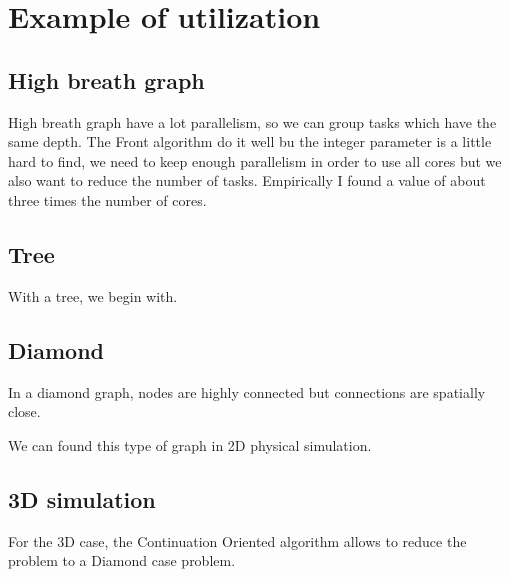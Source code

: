 \section{Example of utilization}
\subsection{High breath graph}
High breath graph have a lot parallelism, so we can group tasks which have the same depth.
The Front algorithm do it well bu the integer parameter is a little hard to find, we need
to keep enough parallelism in order to use all cores but we also want to reduce the number
of tasks.
Empirically I found a value of about three times the number of cores.

\subsection{Tree}
With a tree, we begin with.

\subsection{Diamond}
In a diamond graph, nodes are highly connected but connections are spatially close.


We can found this type of graph in 2D physical simulation.

\subsection{3D simulation}
For the 3D case, the Continuation Oriented algorithm allows to reduce the problem to a Diamond case problem.
